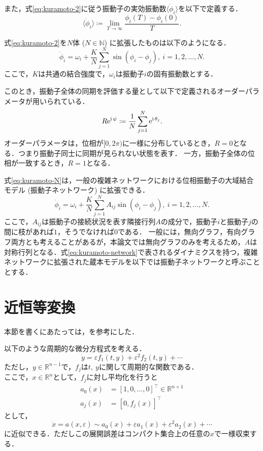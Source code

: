 \documentclass[../main]{subfiles}
\begin{document}
また，式\eqref{eq:kuramoto-2}に従う振動子の実効振動数$\langle\dot{\phi}_i\rangle$を以下で定義する．
\begin{equation}
    \langle\dot{\phi}_i\rangle\coloneqq\lim_{T\to\infty}\frac{\phi_i(T)-\phi_i(0)}{T}.
\end{equation}

式\eqref{eq:kuramoto-2}を$N$体 ($N\in\mathbb{N}$) に拡張したものは以下のようになる．
\begin{equation}
    \label{eq:kuramoto-N}
    \dot{\phi}_i=\omega_i+\frac{K}{N}\sum_{j=1}^N\sin(\phi_i-\phi_j),\ i=1,2,\ldots,N.
\end{equation}
ここで，$K$は共通の結合強度で，$\omega_i$は振動子$i$の固有振動数とする．

このとき，振動子全体の同期を評価する量として以下で定義されるオーダーパラメータが用いられている．
\begin{equation}
    \label{eq:order-parameter}
    R\mathrm{e}^{{\mathrm i\,} \psi}\coloneqq\frac{1}{N}\sum_{j=1}^N\mathrm{e}^{{\mathrm i\,} \theta_j}.    
\end{equation}
オーダーパラメータは，位相が$[0,2\pi)$に一様に分布しているとき，$R= 0$となる．つまり振動子同士に同期が見られない状態を表す．
一方，振動子全体の位相が一致するとき，$R=1$となる．

式\eqref{eq:kuramoto-N}は，一般の複雑ネットワークにおける位相振動子の大域結合モデル (振動子ネットワーク) に拡張できる．
\begin{equation}
    \label{eq:kuramoto-network}
    \dot{\phi}_i=\omega_i+\frac{K}{N}\sum_{j=1}^NA_{ij}\sin(\phi_i-\phi_j),\ i=1,2,\ldots,N.
\end{equation}
ここで，$A_{ij}$は振動子の接続状況を表す隣接行列$A$の成分で，振動子$i$と振動子$j$の間に枝があれば$1$，そうでなければ$0$である．
一般には，無向グラフ，有向グラフ両方とも考えることがあるが，本論文では無向グラフのみを考えるため，$A$は対称行列となる．式\eqref{eq:kuramoto-network}で表されるダイナミクスを持つ，複雑ネットワークに拡張された蔵本モデルを以下では振動子ネットワークと呼ぶこととする．
\section{近恒等変換}
本節を書くにあたっては，\cite{james2003}を参考にした．

以下のような周期的な微分方程式を考える．
\begin{equation}
    \dot{y}=\varepsilon f_1(t,y)+\varepsilon^2f_2(t,y)+\cdots
\end{equation}
ただし，$y\in\mathbb{R}^{n-1}$で，$f_j$は$t,\ y$に関して周期的な関数である．\\
ここで，$x\in\mathbb{R}^{n}$として，$f_j$に対し平均化を行うと
\begin{align}
    a_0(x)&=[1,0,\ldots,0]^\top\in\mathbb{R}^{n+1}\\
    a_j(x)&=[0,f_j(x)]^\top
\end{align}
として，
\begin{equation}
    \dot{x}=a(x,\varepsilon)\sim a_0(x)+\varepsilon a_1(x)+\varepsilon^2 a_2(x)+\cdots
\end{equation}
に近似できる．ただしこの展開誤差はコンパクト集合上の任意の$x$で一様収束する．
\end{document}
